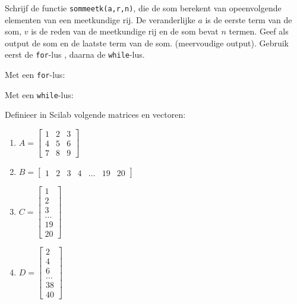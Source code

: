 \begin{oef}
Schrijf de functie  \verb/sommeetk(a,r,n)/, die de som berekent van opeenvolgende elementen van een meetkundige rij.
De veranderlijke $a$ is de eerste term van de som, $v$ is de reden van de meetkundige rij en de som 
bevat $n$ termen. Geef als output  de som en de laatste term van de som.
(meervoudige output). Gebruik eerst de \verb/for/-lus , daarna  de \verb/while/-lus.
\begin{opl}
\begin{samepage}
Met een {\tt for}-lus:
\end{samepage}
\begin{samepage}
Met een {\tt while}-lus:
\end{samepage}
\end{opl}
\end{oef}


\begin{oef}
Definieer in Scilab volgende matrices en vectoren:
\begin{enumerate}
  \item $\displaystyle A=\begin{bmatrix}1&2&3\\4&5&6\\7&8&9\end{bmatrix}$
  \item $B=\begin{bmatrix}1&2&3&4&\ldots&19&20\end{bmatrix}$
  \item $C=\begin{bmatrix}1\\2\\3\\ \ldots \\19\\20\end{bmatrix}$
  \item $D=\begin{bmatrix}2\\4\\6\\\ldots\\38\\40\end{bmatrix}$
\end{enumerate}
\begin{opl}
\end{opl}
\end{oef}



